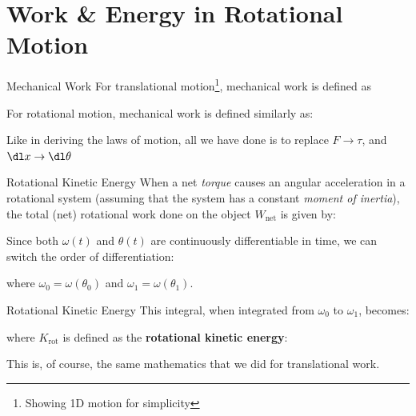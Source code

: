 \documentclass[12pt,compress,aspectratio=169]{beamer}
\begin{document}
\section{Work \& Energy in Rotational Motion}

\begin{frame}{Mechanical Work}
  For translational motion\footnote{Showing 1D motion for simplicity},
  mechanical work is defined as


  For rotational motion, mechanical work is defined similarly as:

  \vspace{.2in}

  Like in deriving the laws of motion, all we have done is to replace
  $F\to\tau$, and $\dl x\to\dl\theta$
\end{frame}



\begin{frame}{Rotational Kinetic Energy}
  When a net \emph{torque} causes an angular acceleration in a rotational
  system (assuming that the system has a constant \emph{moment of inertia}),
  the total (net) rotational work done on the object $W_\text{net}$ is given by:


  Since both $\omega(t)$ and $\theta(t)$ are continuously differentiable in
  time, we can switch the order of differentiation:
  
  where $\omega_0=\omega(\theta_0)$ and $\omega_1=\omega(\theta_1)$.
\end{frame}



\begin{frame}{Rotational Kinetic Energy}
  This integral, when integrated from $\omega_0$ to $\omega_1$, becomes:

  
  where $K_\text{rot}$ is defined as the \textbf{rotational kinetic energy}:

  This is, of course, the same mathematics that we did for translational work.
\end{frame}
\end{document}
